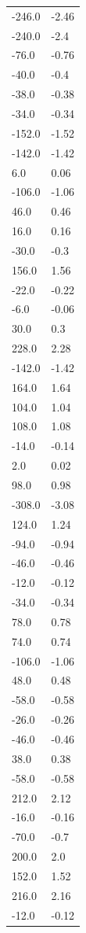 \begin{longtable}{ll}
-246.0 & -2.46 \\
-240.0 & -2.4 \\
-76.0 & -0.76 \\
-40.0 & -0.4 \\
-38.0 & -0.38 \\
-34.0 & -0.34 \\
-152.0 & -1.52 \\
-142.0 & -1.42 \\
6.0 & 0.06 \\
-106.0 & -1.06 \\
46.0 & 0.46 \\
16.0 & 0.16 \\
-30.0 & -0.3 \\
156.0 & 1.56 \\
-22.0 & -0.22 \\
-6.0 & -0.06 \\
30.0 & 0.3 \\
228.0 & 2.28 \\
-142.0 & -1.42 \\
164.0 & 1.64 \\
104.0 & 1.04 \\
108.0 & 1.08 \\
-14.0 & -0.14 \\
2.0 & 0.02 \\
98.0 & 0.98 \\
-308.0 & -3.08 \\
124.0 & 1.24 \\
-94.0 & -0.94 \\
-46.0 & -0.46 \\
-12.0 & -0.12 \\
-34.0 & -0.34 \\
78.0 & 0.78 \\
74.0 & 0.74 \\
-106.0 & -1.06 \\
48.0 & 0.48 \\
-58.0 & -0.58 \\
-26.0 & -0.26 \\
-46.0 & -0.46 \\
38.0 & 0.38 \\
-58.0 & -0.58 \\
212.0 & 2.12 \\
-16.0 & -0.16 \\
-70.0 & -0.7 \\
200.0 & 2.0 \\
152.0 & 1.52 \\
216.0 & 2.16 \\
-12.0 & -0.12 \\

\end{longtable}
